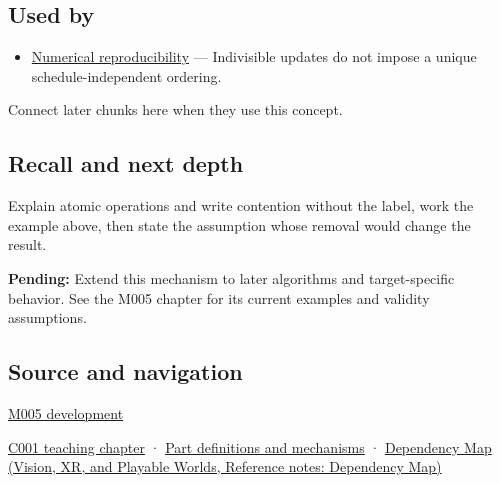 \subsection{Used by}\label{appendix-e12d1b03fefb-used-by}

\hypertarget{appendix-e12d1b03fefb-used-by}{}

\begin{itemize}
\tightlist
\item
  \hyperref[appendix-5f1a2c3f97ff]{Numerical reproducibility} --- Indivisible updates do not impose a unique schedule-independent ordering.
\end{itemize}

Connect later chunks here when they use this concept.

\subsection{Recall and next depth}\label{appendix-e12d1b03fefb-recall-and-next-depth}

\hypertarget{appendix-e12d1b03fefb-recall-and-next-depth}{}

Explain atomic operations and write contention without the label, work the example above, then state the assumption whose removal would change the result.

\textbf{Pending:} Extend this mechanism to later algorithms and target-specific behavior. See the M005 chapter for its current examples and validity assumptions.

\subsection{Source and navigation}\label{appendix-e12d1b03fefb-source-and-navigation}

\hypertarget{appendix-e12d1b03fefb-source-and-navigation}{}

\hyperref[01-foundations-i-ch001-when-arithmetic-meets-uncertainty]{M005 development}

\hyperref[01-foundations-i-ch001-from-a-signal-to-an-interpretation]{C001 teaching chapter} · \hyperref[appendix-fd090d982a15]{Part definitions and mechanisms} · \href{../07-Vision-XR-and-Playable-Worlds/main.pdf\#nameddest=appendix-4ad47bdd269a}{Dependency Map (Vision, XR, and Playable Worlds, Reference notes: Dependency Map)}
